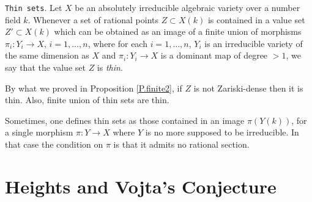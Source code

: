 \documentclass[leqno,12pt]{article} %
\def\P{{{\mathbb P}}}
\theoremstyle{plain} %
\theoremstyle{definition} %
\newtheorem{remark}[theorem]{\indent\sc Remark}
\begin{document}
 \medskip
  
{\tt Thin sets}. Let $X$ be an absolutely irreducible algebraic variety over a number field $k$. Whenever a set of rational points $Z\subset X(k)$ is contained in a value set $Z'\subset X(k)$ which  can be obtained as an image of a finite union of morphisms $\pi_i:Y_i\to X$, $i=1,\ldots,n$, where for each $i=1,\ldots,n$,  $Y_i$ is an irreducible variety of the same dimension as $X$ and $\pi_i:Y_i\to X$ is a dominant map of degree $>1$, we say that the value set $Z$ is {\it thin}.

By what we proved in Proposition \ref{P.finite2}, if $Z$ is not Zariski-dense then it is thin. Also, finite union of thin sets are thin.

Sometimes, one defines thin sets as those contained in an image $\pi(Y(k))$, for a single morphism $\pi:Y\to X$ where $Y$ is no more  supposed to be irreducible. In that case the condition on $\pi$ is that it admits no rational section.

 

 




 

  




\section{Heights and Vojta's Conjecture}\label{S.H} 
\end{document}
